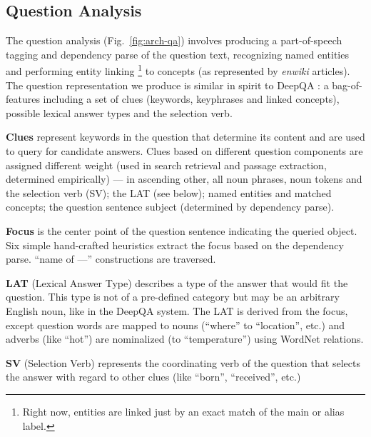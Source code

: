 \subsection{Question Analysis}

The question analysis (Fig.~\ref{fig:arch-qa}) involves
producing a part-of-speech tagging and dependency parse of the question text,
recognizing named entities and
performing entity linking%
\footnote{Right now, entities are linked just by an exact match of the main or alias label.}
to concepts (as represented by \textit{enwiki} articles).
The question representation we produce is similar in spirit
to DeepQA \citep{WatsonQuestion}: a bag-of-features including
a set of clues (keywords, keyphrases and linked concepts),
possible lexical answer types and the selection verb.

\textbf{Clues} represent keywords in the question that determine its content
and are used to query for candidate answers.
Clues based on different question components are assigned different weight
(used in search retrieval and passage extraction, determined empirically) ---
in ascending other, all noun phrases, noun tokens and the selection verb (SV);
the LAT (see below); named entities and matched concepts;
the question sentence subject (determined by dependency parse).

\textbf{Focus} is the center point of the question sentence
indicating the queried object.
Six simple hand-crafted heuristics extract the focus based on the dependency parse.
``name of ---'' constructions are traversed.

\textbf{LAT} (Lexical Answer Type) describes a type of the answer that would fit the question.
This type is not of a pre-defined category but may be an arbitrary English noun,
like in the DeepQA system. \citep{WatsonTyCor}
The LAT is derived from the focus, except question words are mapped to nouns
(``where'' to ``location'', etc.)
and adverbs (like ``hot'') are nominalized (to ``temperature'') using WordNet relations.

\textbf{SV} (Selection Verb) represents the coordinating verb of the
question that selects the answer with regard to other clues (like ``born'',
``received'', etc.)

